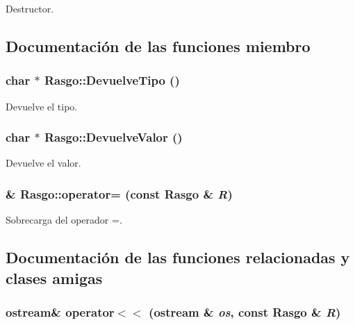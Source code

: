 Destructor. 



\subsection{Documentación de las funciones miembro}
\hypertarget{class_rasgo_208a94566807a9565066df206cb246ef}{
\subsubsection[{DevuelveTipo}]{\setlength{\rightskip}{0pt plus 5cm}char $\ast$ Rasgo::DevuelveTipo ()}}
\label{class_rasgo_208a94566807a9565066df206cb246ef}


Devuelve el tipo. 

\hypertarget{class_rasgo_30e76ff8cd1878f6341f3d0b3ce97ef3}{
\subsubsection[{DevuelveValor}]{\setlength{\rightskip}{0pt plus 5cm}char $\ast$ Rasgo::DevuelveValor ()}}
\label{class_rasgo_30e76ff8cd1878f6341f3d0b3ce97ef3}


Devuelve el valor. 

\hypertarget{class_rasgo_915b93eab9642f2fe9dfef02561f04d8}{
\subsubsection[{operator=}]{ \& Rasgo::operator= (const {\bf Rasgo} \& {\em R})}}
\label{class_rasgo_915b93eab9642f2fe9dfef02561f04d8}


Sobrecarga del operador =. 



\subsection{Documentación de las funciones relacionadas y clases amigas}
\hypertarget{class_rasgo_af9fbba2f1a84943d6b21d1c46339b57}{
\subsubsection[{operator$<$$<$}]{\setlength{\rightskip}{0pt plus 5cm}ostream\& operator$<$$<$ (ostream \& {\em os}, \/  const {\bf Rasgo} \& {\em R})}}
\label{class_rasgo_af9fbba2f1a84943d6b21d1c46339b57}


